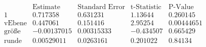 \[\begin{array}{l|llll}
 \text{} & \text{Estimate} & \text{Standard Error} & \text{t-Statistic} & \text{P-Value} \\
\hline
 1 & 0.717358 & 0.631231 & 1.13644 & 0.260145 \\
 \text{vEbene} & 0.447061 & 0.151416 & 2.95254 & 0.00444651 \\
 \text{gr{\" o}{\ss}e} & -0.00137015 & 0.00315333 & -0.434507 & 0.665429 \\
 \text{runde} & 0.00529011 & 0.0263161 & 0.201022 & 0.84134 \\
\end{array}\]

